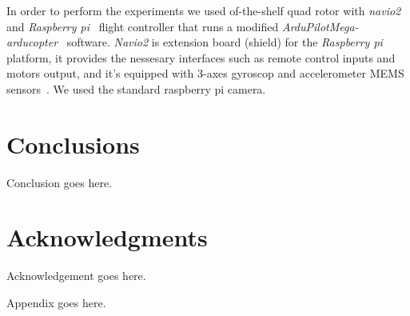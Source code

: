 \documentclass{sig-alternate-ipsn13}
\begin{document}
In order to perform the experiments we used of-the-shelf quad rotor with \textit{navio2}~\cite{navio} and \textit{Raspberry pi}~\cite{raspberry} flight controller that runs a modified \textit{ArduPilotMega-arducopter}~\cite{APM} software.
\textit{Navio2} is extension board (shield) for the \textit{Raspberry pi}~\cite{raspberry} platform, it provides the nessesary interfaces such as remote control inputs and motors output, and it's equipped with 3-axes gyroscop and accelerometer MEMS sensors~\cite{MEMS}.
We used the standard raspberry pi camera. %



\section{Conclusions}
Conclusion goes here.


\section*{Acknowledgments}
Acknowledgement goes here.


%

%
%
\appendix

Appendix goes here.

\end{document}
